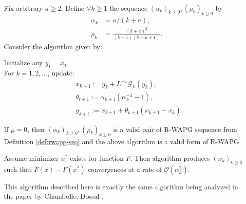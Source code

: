 \documentclass[12pt]{article}
\begin{document}
        \begin{theorem}\label{thm:r-wapg-on-cham-doss}\;\\
            Fix arbitrary $a \ge 2$.
            Define $\forall k \ge 1$ the sequence $(\alpha_k)_{k \ge 0}, (\rho_k)_{k \ge 0}$ by 
            \begin{align*}
                \alpha_k &= a/(k + a), 
                \\
                \rho_k &= \frac{(k + a)^2}{(k + 1)(k + a + 1)}. 
            \end{align*}
            Consider the algorithm given by: 
            \begin{tcolorbox}
                Initialize any $y_1 = x_1$. 
                \\
                For $k = 1, 2, \ldots$, update: 
                \begin{align*}
                    & x_{k + 1} := y_k + L^{-1}\mathcal G_L(y_k), 
                    \\
                    & \theta_{t + 1} := \alpha_{k + 1}(\alpha_k^{-1} - 1),
                    \\
                    & y_{k + 1} := x_{k + 1} + \theta_{k + 1}(x_{k + 1} - x_k). 
                \end{align*}    
            \end{tcolorbox}
            If $\mu = 0$, then $(\alpha_k)_{k \ge 0}, (\rho_k)_{k \ge 0}$ is a valid pair of R-WAPG sequence from Definition \ref{def:rwapg-seq} and the above algorithm is a valid form of R-WAPG. 
            \par
            Assume minimizer $x^*$ exists for function $F$. 
            Then algorithm produces $(x_k)_{k \ge0}$ such that $F(x) - F(x^*)$ convergences at a rate of $\mathcal O(\alpha_k^2)$. 
        \end{theorem}
        \begin{remark}
            This algorithm described here is exactly the same algorithm being analyzed in the paper by Chambolle, Dossal \cite{chambolle_convergence_2015}. 
        \end{remark}
\end{document}
